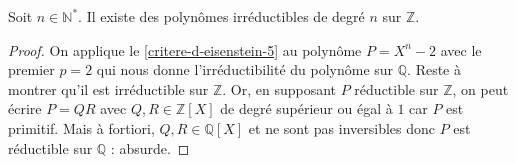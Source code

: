 
	\begin{application}
		Soit $n \in \mathbb{N}^*$. Il existe des polynômes irréductibles de degré $n$ sur $\mathbb{Z}$.
	\end{application}

	\begin{proof}
		On applique le \cref{critere-d-eisenstein-5} au polynôme $P = X^n - 2$ avec le premier $p = 2$ qui nous donne l'irréductibilité du polynôme sur $\mathbb{Q}$. Reste à montrer qu'il est irréductible sur $\mathbb{Z}$.
		\newpar
		Or, en supposant $P$ réductible sur $\mathbb{Z}$, on peut écrire $P = QR$ avec $Q, R \in \mathbb{Z}[X]$ de degré supérieur ou égal à $1$ car $P$ est primitif. Mais à fortiori, $Q, R \in \mathbb{Q}[X]$ et ne sont pas inversibles donc $P$ est réductible sur $\mathbb{Q}$ : absurde.
	\end{proof}

